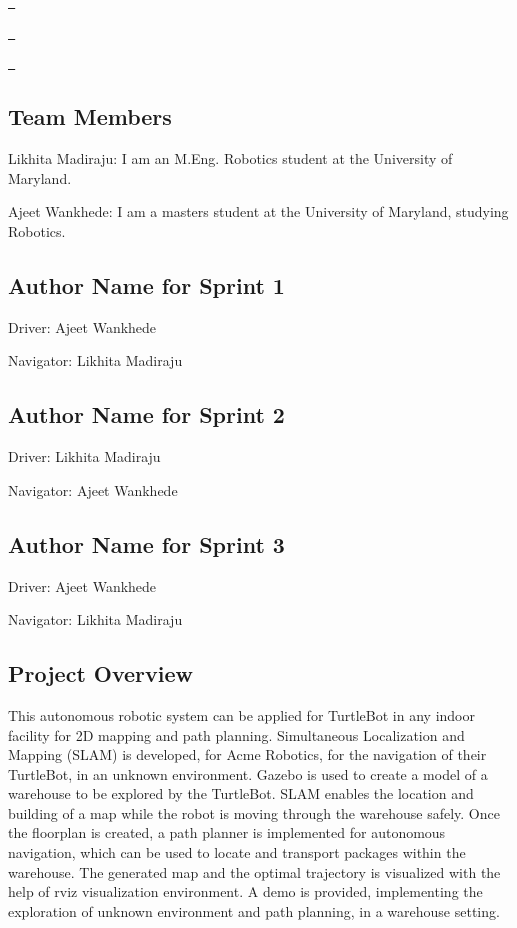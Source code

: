 \href{https://travis-ci.org/ajeetwankhede/The-Explorer-Robot}\texttt{ }

\href{https://coveralls.io/github/ajeetwankhede/The-Explorer-Robot}\texttt{ }

\href{https://opensource.org/licenses/MIT}\texttt{ }

\subsection*{Team Members}


\begin{DoxyEnumerate}
\item Likhita Madiraju\+: I am an M.\+Eng. Robotics student at the University of Maryland.
\item Ajeet Wankhede\+: I am a master\textquotesingle{}s student at the University of Maryland, studying Robotics.
\end{DoxyEnumerate}

\subsection*{Author Name for Sprint 1}

Driver\+: Ajeet Wankhede

Navigator\+: Likhita Madiraju

\subsection*{Author Name for Sprint 2}

Driver\+: Likhita Madiraju

Navigator\+: Ajeet Wankhede

\subsection*{Author Name for Sprint 3}

Driver\+: Ajeet Wankhede

Navigator\+: Likhita Madiraju

\subsection*{Project Overview}

This autonomous robotic system can be applied for Turtle\+Bot in any indoor facility for 2D mapping and path planning. Simultaneous Localization and Mapping (S\+L\+AM) is developed, for Acme Robotics, for the navigation of their Turtle\+Bot, in an unknown environment. Gazebo is used to create a model of a warehouse to be explored by the Turtle\+Bot. S\+L\+AM enables the location and building of a map while the robot is moving through the warehouse safely. Once the floorplan is created, a path planner is implemented for autonomous navigation, which can be used to locate and transport packages within the warehouse. The generated map and the optimal trajectory is visualized with the help of rviz visualization environment. A demo is provided, implementing the exploration of unknown environment and path planning, in a warehouse setting. ~\newline
